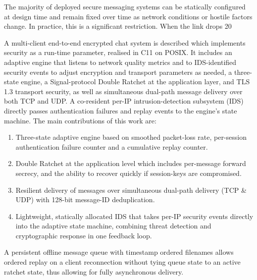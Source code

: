\documentclass[conference]{IEEEtran}
\begin{document}
The majority of deployed secure messaging systems can be statically configured at design time and remain fixed over time as network conditions or hostile factors change. In practice, this is a significant restriction. When the link drops 20%

A multi-client end-to-end encrypted chat system is described which implements security as a run-time parameter, realised in C11 on POSIX. It includes an adaptive engine that listens to network quality metrics and to IDS-identified security events to adjust encryption and transport parameters as needed, a three-state engine, a Signal-protocol Double Ratchet at the application layer, and TLS~ 1.3 transport security, as well as simultaneous dual-path message delivery over both TCP and UDP. A co-resident per-IP intrusion-detection subsystem (IDS) directly passes authentication failures and replay events to the engine's state machine. The main contributions of this work are:

\begin{enumerate}
    \item Three-state adaptive engine based on smoothed packet-loss rate, per-session authentication failure counter and a cumulative replay counter.
    \item Double Ratchet at the application level which includes per-message forward secrecy, and the ability to recover quickly if session-keys are compromised.
    \item Resilient delivery of messages over simultaneous dual-path delivery (TCP \& UDP) with 128-bit message-ID deduplication.
    \item Lightweight, statically allocated IDS that takes per-IP security events directly into the adaptive state machine, combining threat detection and cryptographic response in one feedback loop.
\end{enumerate}

A persistent offline message queue with timestamp ordered filenames allows ordered replay on a client reconnection without tying queue state to an active ratchet state, thus allowing for fully asynchronous delivery.
\end{document}
